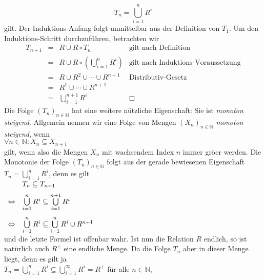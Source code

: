\[ T_n = \bigcup\limits_{i=1}^{n} R^i \]
gilt.  Der Induktions-Anfang folgt unmittelbar aus der Definition von $T_1$.  Um den 
Induktions-Schritt durchzuf\"{u}hren, betrachten wir
\[ \begin{array}{lcll}
   T_{n+1} & = & R \cup R \circ T_n & \mbox{gilt nach Definition} \\[0.2cm]
           & = & R \cup R \circ \left(\bigcup\limits_{i=1}^{n} R^i\right) &
                 \mbox{gilt nach Induktions-Voraussetzung} \\[0.4cm]
           & = & R \cup R^2 \cup \cdots \cup R^{n+1}  &
                 \mbox{Distributiv-Gesetz} \\[0.2cm]
           & = & R^1 \cup \cdots \cup R^{n+1} \\
           & = & \bigcup\limits_{i=1}^{n+1} R^i & \Box 
   \end{array}
\]
Die Folge $(T_n)_{n\in\mathbb{N}}$ hat eine weitere n\"{u}tzliche Eigenschaft: Sie ist 
\emph{monoton steigend}.  Allgemein nennen wir eine Folge von Mengen $(X_n)_{n\in\mathbb{N}}$
\emph{monoton steigend}, wenn 
\\[0.2cm]
\hspace*{1.3cm}
$\forall n \in \mathbb{N}: X_n \subseteq X_{n+1}$
\\[0.2cm]
gilt, wenn also die Mengen $X_n$ mit wachsendem Index $n$ immer gr\"{o}\3er werden.
Die Monotonie der Folge $(T_n)_{n \in \mathbb{N}}$ folgt aus der gerade bewiesenen Eigenschaft
$T_n = \bigcup_{i=1}^{n} R^i$, denn es gilt
\\[0.2cm]
\hspace*{1.3cm}
$
\begin{array}[t]{llcl}
                & T_n \subseteq T_{n+1} \\[0.2cm]
\Leftrightarrow & \bigcup\limits_{i=1}^{n} R^i \subseteq \bigcup\limits_{i=1}^{n+1} R^i \\[0.5cm]
\Leftrightarrow & \bigcup\limits_{i=1}^{n} R^i \subseteq \bigcup\limits_{i=1}^{n} R^i \cup R^{n+1} \\
\end{array}
$
\\[0.2cm]
und die letzte Formel ist offenbar wahr.  Ist nun die Relation $R$ endlich, so ist nat\"{u}rlich 
auch $R^+$ eine endliche Menge.  Da die 
Folge $T_n$ aber in dieser Menge liegt, denn es gilt ja 
\\[0.2cm]
\hspace*{1.3cm}
$T_n = \bigcup\limits_{i=1}^{n} R^i \subseteq \bigcup\limits_{i=1}^{\infty} R^i = R^+$ \quad f\"{u}r alle $n \in \mathbb{N}$,
